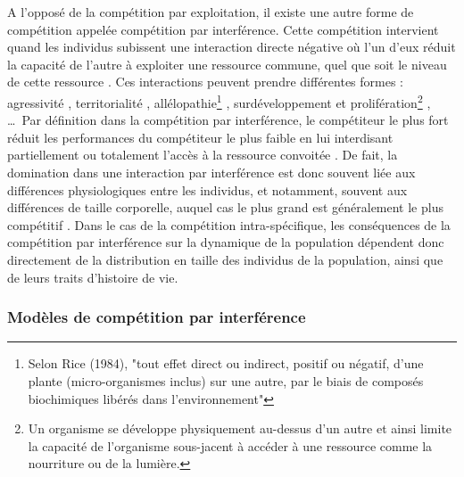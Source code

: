 A l'opposé de la compétition par exploitation, il existe une autre forme de
compétition appelée compétition par interférence. Cette compétition intervient
quand les individus subissent une interaction directe négative où l'un d'eux
réduit la capacité de l'autre à exploiter une ressource commune, quel que soit
le niveau de cette ressource \autocites{park1954a,vance1984a}. Ces interactions
peuvent prendre différentes formes : agressivité \autocites{schoener1976a},
territorialité \autocites{walls1990a,kennedy1996a}, allélopathie\footnote{Selon
Rice (1984), "tout effet direct ou indirect, positif ou négatif, d'une plante
(micro-organismes inclus) sur une autre, par le biais de composés biochimiques
libérés dans l'environnement"} \autocites{harper1977a,rice1984a,nilsson1994a},
surdéveloppement et prolifération\footnote{Un organisme se
développe physiquement au-dessus d'un autre et ainsi limite la capacité de
l'organisme sous-jacent à accéder à une ressource comme la nourriture ou de la
lumière.} \autocites{connell1961a,paine1966a}, \ldots~Par définition dans la
compétition par interférence, le compétiteur le plus fort réduit les
performances du compétiteur le plus faible en lui interdisant partiellement ou
totalement l'accès à la ressource convoitée \autocites{schoener1983a,
thompson1993a}. De fait, la domination dans une interaction par interférence est
donc souvent liée aux différences physiologiques entre les individus, et
notamment, souvent aux différences de taille corporelle, auquel cas le plus
grand est généralement le plus compétitif \autocites{mccormick2012a}. Dans le
cas de la compétition intra-spécifique, les conséquences de la compétition par
interférence sur la dynamique de la population dépendent donc directement de la
distribution en taille des individus de la population, ainsi que de leurs traits
d'histoire de vie.

\subsubsection{Modèles de compétition par interférence}

